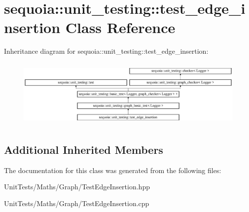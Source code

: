 \hypertarget{classsequoia_1_1unit__testing_1_1test__edge__insertion}{}\section{sequoia\+::unit\+\_\+testing\+::test\+\_\+edge\+\_\+insertion Class Reference}
\label{classsequoia_1_1unit__testing_1_1test__edge__insertion}
Inheritance diagram for sequoia\+::unit\+\_\+testing\+::test\+\_\+edge\+\_\+insertion\+:\begin{figure}[H]
\begin{center}
\leavevmode
\includegraphics[height=3.357314cm]{classsequoia_1_1unit__testing_1_1test__edge__insertion}
\end{center}
\end{figure}
\subsection*{Additional Inherited Members}


The documentation for this class was generated from the following files\+:\begin{DoxyCompactItemize}
\item 
Unit\+Tests/\+Maths/\+Graph/Test\+Edge\+Insertion.\+hpp\item 
Unit\+Tests/\+Maths/\+Graph/Test\+Edge\+Insertion.\+cpp\end{DoxyCompactItemize}
